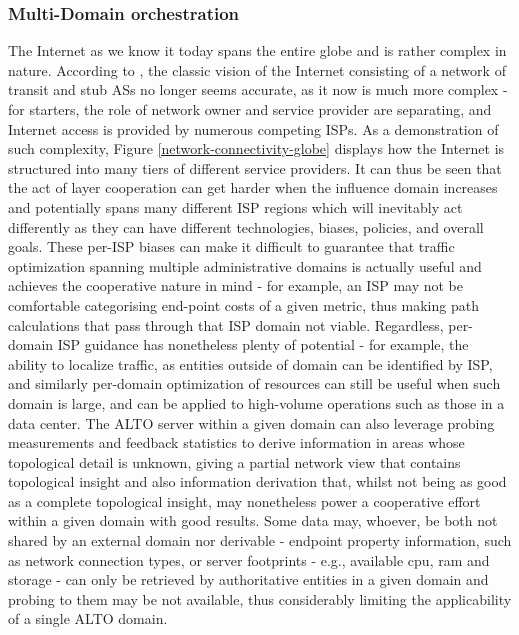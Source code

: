 \subsubsection{Multi-Domain orchestration}

    The Internet as we know it today spans the entire globe and is rather complex in nature.
    According to \cite{dan-Commag10}, the classic vision of the Internet consisting of a network of transit and stub ASs no longer seems accurate, as it now is much more complex - for starters, the role of network owner and service provider are separating, and Internet access is provided by numerous competing ISPs.
    As a demonstration of such complexity, Figure \ref{network-connectivity-globe} displays how the Internet is structured into many tiers of different service providers.
    It can thus be seen that the act of layer cooperation can get harder when the influence domain increases and potentially spans many different ISP regions which will inevitably act differently as they can have different technologies, biases, policies, and overall goals.
    These per-ISP biases can make it difficult to guarantee that traffic optimization spanning multiple administrative domains is actually useful and achieves the cooperative nature in mind - for example, an ISP may not be comfortable categorising end-point costs of a given metric, thus making path calculations that pass through that ISP domain not viable.
    Regardless, per-domain ISP guidance has nonetheless plenty of potential - for example, the ability to localize traffic, as entities outside of domain can be identified by ISP, and similarly per-domain optimization of resources can still be useful when such domain is large, and can be applied to high-volume operations such as those in a data center.
    The ALTO server within a given domain can also leverage probing measurements and feedback statistics to derive information in areas whose topological detail is unknown, giving a partial network view that contains topological insight and also information derivation that, whilst not being as good as a complete topological insight, may nonetheless power a cooperative effort within a given domain with good results.
    Some data may, whoever, be both not shared by an external domain nor derivable - endpoint property information, such as network connection types, or server footprints - e.g., available cpu, ram and storage - can only be retrieved by authoritative entities in a given domain and probing to them may be not available, thus considerably limiting the applicability of a single ALTO domain.

